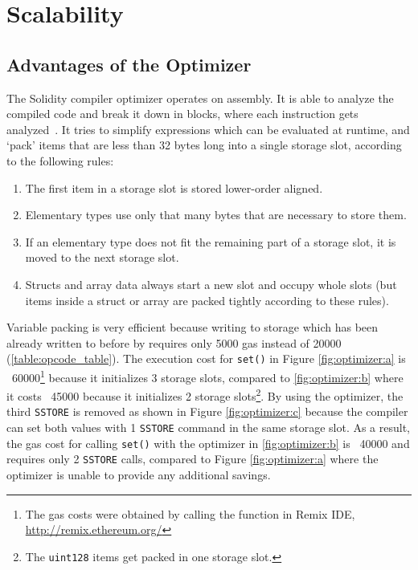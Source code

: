 \chapter{Scalability} \label{apx:scalability}

\section{Advantages of the Optimizer}

The Solidity compiler optimizer operates on assembly. It is able to analyze the compiled code and break it down in blocks, where each instruction gets analyzed~\cite{docsmisc}. It tries to simplify expressions which can be evaluated at runtime, and `pack' items that are less than 32 bytes long into a single storage slot, according to the following rules:

\begin{enumerate}
  \item The first item in a storage slot is stored lower-order aligned.
  \item Elementary types use only that many bytes that are necessary to store them.
  \item If an elementary type does not fit the remaining part of a storage slot, it is moved to the next storage slot.
  \item Structs and array data always start a new slot and occupy whole slots (but items inside a struct or array are packed tightly according to these rules).
\end{enumerate}

Variable packing is very efficient because writing to storage which has been already written to before by  requires only 5000 gas instead of 20000 (\ref{table:opcode_table}). The execution cost for \texttt{set()} in Figure \ref{fig:optimizer:a} is ~60000\footnote{The gas costs were obtained by calling the function in Remix IDE, \url{http://remix.ethereum.org/}} because it initializes 3 storage slots, compared to \ref{fig:optimizer:b} where it costs ~45000 because it initializes 2 storage slots\footnote{The \texttt{uint128} items get packed in one storage slot.}. By using the optimizer, the third \texttt{SSTORE} is removed as shown in Figure \ref{fig:optimizer:c} because the compiler can set both values with 1 \texttt{SSTORE} command in the same storage slot. As a result, the gas cost for calling \texttt{set()} with the optimizer in \ref{fig:optimizer:b} is ~40000 and requires only 2 \texttt{SSTORE} calls, compared to Figure \ref{fig:optimizer:a} where the optimizer is unable to provide any additional savings.

